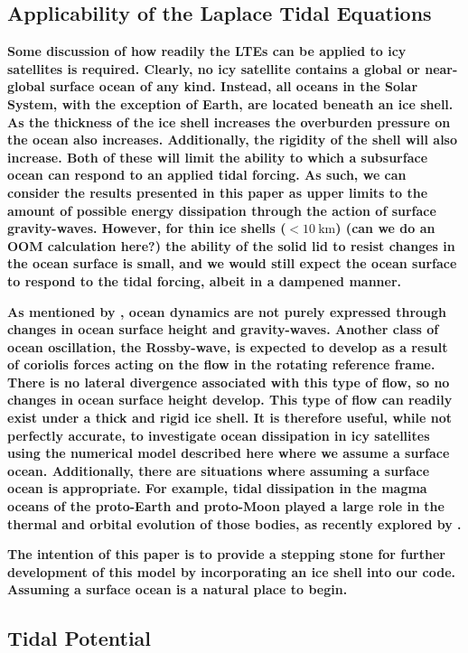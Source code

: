 \subsection{\textbf{Applicability of the Laplace Tidal Equations} \label{subsec:applicability}}

\textbf{Some discussion of how readily the LTEs can be applied to icy satellites is required. Clearly, no icy satellite contains a global or near-global surface ocean of any kind. Instead, all oceans in the Solar System, with the exception of Earth, are located beneath an ice shell. As the thickness of the ice shell increases the overburden pressure on the ocean also increases. Additionally, the rigidity of the shell will also increase. Both of these will limit the ability to which a subsurface ocean can respond to an applied tidal forcing. As such, we can consider the results presented in this paper as upper limits to the amount of possible energy dissipation through the action of surface gravity-waves. However, for thin ice shells ($<\SI{10}{\kilo\metre}$) (can we do an OOM calculation here?) the ability of the solid lid to resist changes in the ocean surface is small, and we would still expect the ocean surface to respond to the tidal forcing, albeit in a dampened manner.}   

\textbf{As mentioned by \citet{tyler2008strong}, ocean dynamics are not purely expressed through changes in ocean surface height and gravity-waves. Another class of ocean oscillation, the Rossby-wave, is expected to develop as a result of coriolis forces acting on the flow in the rotating reference frame. There is no lateral divergence associated with this type of flow, so no changes in ocean surface height develop. This type of flow can readily exist under a thick and rigid ice shell. It is therefore useful, while not perfectly accurate, to investigate ocean dissipation in icy satellites using the numerical model described here where we assume a surface ocean. Additionally, there are situations where assuming a surface ocean is appropriate. For example, tidal dissipation in the magma oceans of the proto-Earth and proto-Moon played a large role in the thermal and orbital evolution of those bodies, as recently explored by \citet{chen2016tidal}.}

\textbf{The intention of this paper is to provide a stepping stone for further development of this model by incorporating an ice shell into our code. Assuming a surface ocean is a natural place to begin.}


\subsection{Tidal Potential \label{subsec:pot}}

